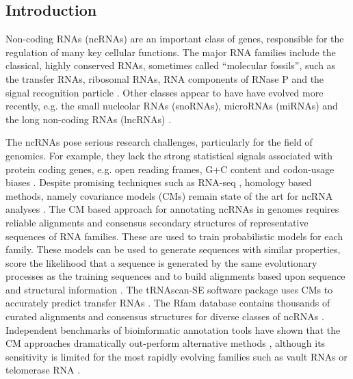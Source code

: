 \documentclass[10pt]{bmc_article}
\newenvironment{bmcformat}{\begin{raggedright}\baselineskip20pt\sloppy\setboolean{publ}{false}}{\end{raggedright}\baselineskip20pt\sloppy}
\begin{document}
\begin{bmcformat}



\section*{Introduction}

Non-coding RNAs (ncRNAs) are an important class of genes, responsible
for the regulation of many key cellular functions. The major RNA
families include the classical, highly conserved RNAs, sometimes
called ``molecular fossils'', such as the transfer RNAs, ribosomal
RNAs, RNA components of RNase P and the signal recognition particle
\cite{Jeffares:1998}. Other classes appear to have have evolved more
recently, e.g. the small nucleolar RNAs (snoRNAs), microRNAs (miRNAs)
and the long non-coding RNAs (lncRNAs) \cite{Hoeppner:2012}.

The ncRNAs pose serious research challenges, particularly for the
field of genomics. For example, they lack the strong statistical
signals associated with protein coding genes, e.g. open reading
frames, G+C content and codon-usage biases \cite{Rivas:2000}. Despite
promising techniques such as RNA-seq \cite{Croucher:2010}, homology
based methods, namely covariance models (CMs) remain state of the art
for ncRNA analyses \cite{Sakakibara:1994,Eddy:1994,Nawrocki:2009}.
The CM based approach for annotating ncRNAs in genomes requires
reliable alignments and consensus secondary structures of
representative sequences of RNA families. These are used to train
probabilistic models for each family. These models can be used to
generate sequences with similar properties, score the likelihood that
a sequence is generated by the same evolutionary processes as the
training sequences and to build alignments based upon sequence and
structural information \cite{Sakakibara:1994,Eddy:1994,Nawrocki:2009}.
The tRNAscan-SE software package uses CMs to accurately predict
transfer RNAs \cite{Lowe:1997,Chan:2009}.  The Rfam database contains
thousands of curated alignments and consensus structures for diverse
classes of ncRNAs
\cite{Griffiths-Jones:2003,Griffiths-Jones:2005,Gardner:2009,Gardner:2011a,Burge:2013}.
Independent benchmarks of bioinformatic annotation tools have shown
that the CM approaches dramatically out-perform alternative methods
\cite{Freyhult:2007}, although its sensitivity is limited for the most
rapidly evolving families such as vault RNAs or telomerase RNA
\cite{Menzel:09a}.


\end{bmcformat}
\end{document}
